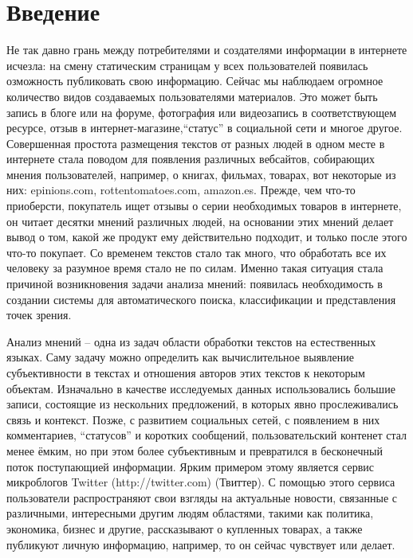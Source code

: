 \section*{Введение}

Не так давно грань между потребителями и создателями информации в интернете
исчезла: на смену статическим страницам у всех пользователей появилась
озможность публиковать свою информацию. Сейчас мы наблюдаем огромное
количество видов создаваемых пользователями материалов. Это может быть запись
в блоге или на форуме, фотография или видеозапись в соответствующем
ресурсе, отзыв в интернет-магазине,``статус'' в социальной сети и многое другое.
Совершенная простота размещения текстов от разных людей в одном месте
в интернете стала поводом для появления различных вебсайтов, собирающих мнения
пользователей, например, о книгах, фильмах, товарах, вот некоторые из них:
epinions.com, rottentomatoes.com, amazon.es. Прежде, чем что-то приоберсти,
покупатель ищет отзывы о серии необходимых товаров в интернете, он читает
десятки мнений различных людей, на основании этих мнений делает вывод о том,
какой же продукт ему действительно подходит, и только после этого что-то покупает.
Со временем текстов стало так много, что обработать все их человеку за разумное
время стало не по силам. Именно такая ситуация стала причиной возникновения
задачи анализа мнений: появилась необходимость в создании системы для
автоматического поиска, классификации и представления точек зрения.

Анализ мнений -- одна из задач области обработки текстов на естественных
языках. Саму задачу можно определить как вычислительное выявление
субъективности в текстах и отношения авторов этих текстов к некоторым объектам.
Изначально в качестве исследуемых данных использовались большие записи,
состоящие из нескольних предложений, в которых явно прослеживались связь и
контекст. Позже, с развитием социальных сетей, с появлением в них комментариев,
``статусов'' и  коротких сообщений, пользовательский контенет стал менее ёмким,
но при этом более субъективным и превратился в бесконечный поток поступающией
информации. Ярким примером этому является сервис микроблогов
Twitter (http://twitter.com) (Твиттер). С помощью этого сервиса пользователи распространяют
свои взгляды на актуальные новости, связанные с различными, интересными
другим людям областями, такими как политика, экономика, бизнес и другие,
рассказывают о купленных товарах, а также публикуют личную информацию, например,
то он сейчас чувствует или делает.

